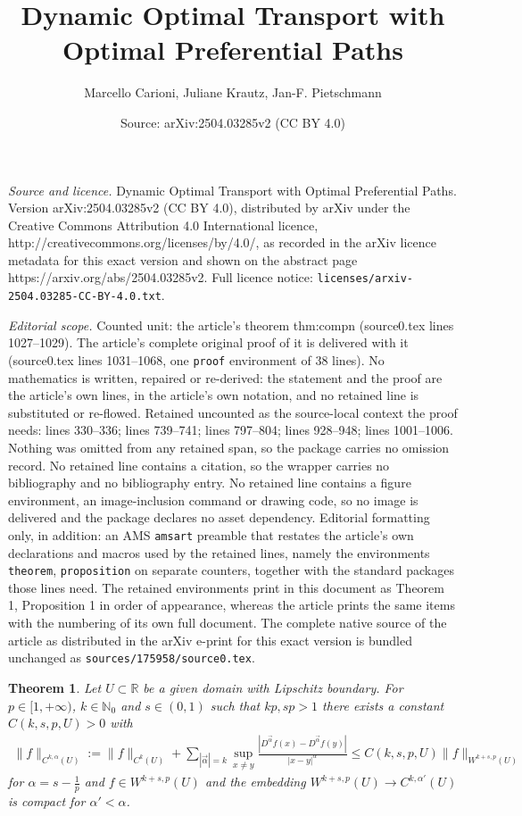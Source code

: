 \documentclass[10pt,a4paper]{amsart}
\title{Dynamic Optimal Transport with Optimal Preferential Paths}
\author{Marcello Carioni, Juliane Krautz, Jan-F. Pietschmann}
\date{Source: arXiv:2504.03285v2 (CC BY 4.0)}
\newtheorem{theorem}{Theorem}
\def\R{{\mathbb R}}
\begin{document}
\maketitle

\noindent\emph{Source and licence.} Dynamic Optimal Transport with Optimal Preferential Paths. Version arXiv:2504.03285v2 (CC BY 4.0), distributed by arXiv under the Creative Commons Attribution 4.0 International licence, http://creativecommons.org/licenses/by/4.0/, as recorded in the arXiv licence metadata for this exact version and shown on the abstract page https://arxiv.org/abs/2504.03285v2. Full licence notice: \texttt{licenses/arxiv-2504.03285-CC-BY-4.0.txt}.\par\smallskip

\noindent\textit{Editorial scope.} Counted unit: the article's theorem thm:compn (source0.tex lines 1027--1029). The article's complete original proof of it is delivered with it (source0.tex lines 1031--1068, one \texttt{proof} environment of 38 lines). No mathematics is written, repaired or re-derived: the statement and the proof are the article's own lines, in the article's own notation, and no retained line is substituted or re-flowed.  Retained uncounted as the source-local context the proof needs: lines 330--336; lines 739--741; lines 797--804; lines 928--948; lines 1001--1006.  Nothing was omitted from any retained span, so the package carries no omission record.  No retained line contains a citation, so the wrapper carries no bibliography and no bibliography entry.  No retained line contains a figure environment, an image-inclusion command or drawing code, so no image is delivered and the package declares no asset dependency.  Editorial formatting only, in addition: an AMS \texttt{amsart} preamble that restates the article's own declarations and macros used by the retained lines, namely the environments \texttt{theorem}, \texttt{proposition} on separate counters, together with the standard packages those lines need.  The retained environments print in this document as Theorem 1, Proposition 1 in order of appearance, whereas the article prints the same items with the numbering of its own full document.  The complete native source of the article as distributed in the arXiv e-print for this exact version is bundled unchanged as \texttt{sources/175958/source0.tex}.
\begin{theorem}\label{CmpctEmbedding}
    Let $U\subset\R$ be a given domain with Lipschitz boundary. For $p\in[1,+\infty)$, $k\in\mathbb{N}_0$ and $s\in(0,1)$ such that $kp,sp > 1$ there exists a constant $C(k,s,p,U)>0$ with
    \begin{align*}
        \|f\|_{C^{k,\alpha}(U)} := \|f\|_{C^k(U)} + \sum\limits_{|\vec{\alpha}|=k}\sup\limits_{x\neq y} \frac{|D^{\vec{\alpha}}f(x) - D^{\vec{\alpha}}f(y)|}{|x-y|^\alpha} \leq C(k,s,p,U) \|f\|_{W^{k+s,p}(U)} 
    \end{align*}
    for $\alpha = s-\frac{1}{p}$ and $f\in W^{k+s,p}(U)$ and the embedding $W^{k+s,p}(U) \to C^{k,\alpha'}(U)$ is compact for $\alpha'<\alpha$.
\end{theorem}
\end{document}
